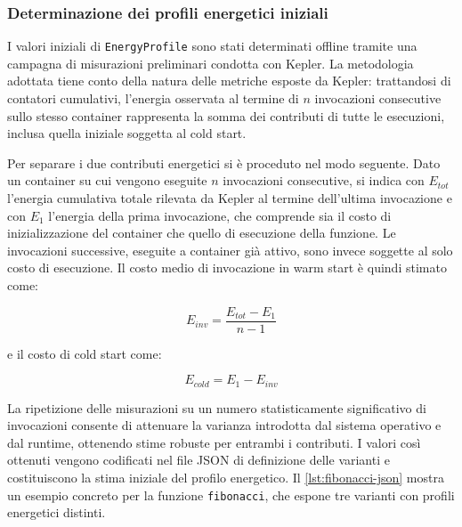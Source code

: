 \subsubsection{Determinazione dei profili energetici iniziali}

I valori iniziali di \texttt{EnergyProfile} sono stati determinati 
offline tramite una campagna di misurazioni preliminari condotta con 
Kepler. La metodologia adottata tiene conto della natura delle metriche 
esposte da Kepler: trattandosi di contatori cumulativi, l'energia 
osservata al termine di $n$ invocazioni consecutive sullo stesso 
container rappresenta la somma dei contributi di tutte le esecuzioni, 
inclusa quella iniziale soggetta al cold start.

Per separare i due contributi energetici si è proceduto nel modo 
seguente. Dato un container su cui vengono eseguite $n$ invocazioni 
consecutive, si indica con $E_{tot}$ l'energia cumulativa totale 
rilevata da Kepler al termine dell'ultima invocazione e con $E_1$ 
l'energia della prima invocazione, che comprende sia il costo di 
inizializzazione del container che quello di esecuzione della funzione. 
Le invocazioni successive, eseguite a container già attivo, sono invece 
soggette al solo costo di esecuzione. Il costo medio di invocazione in 
warm start è quindi stimato come:

\begin{equation}
    E_{inv} = \frac{E_{tot} - E_1}{n - 1}
    \label{eq:inv-joule}
\end{equation}

e il costo di cold start come:

\begin{equation}
    E_{cold} = E_1 - E_{inv}
    \label{eq:cold-joule}
\end{equation}

La ripetizione delle misurazioni su un numero statisticamente 
significativo di invocazioni consente di attenuare la varianza 
introdotta dal sistema operativo e dal runtime, ottenendo stime 
robuste per entrambi i contributi. I valori così ottenuti vengono 
codificati nel file JSON di definizione delle varianti e costituiscono 
la stima iniziale del profilo energetico. Il \autoref{lst:fibonacci-json} 
mostra un esempio concreto per la funzione \texttt{fibonacci}, che 
espone tre varianti con profili energetici distinti.

